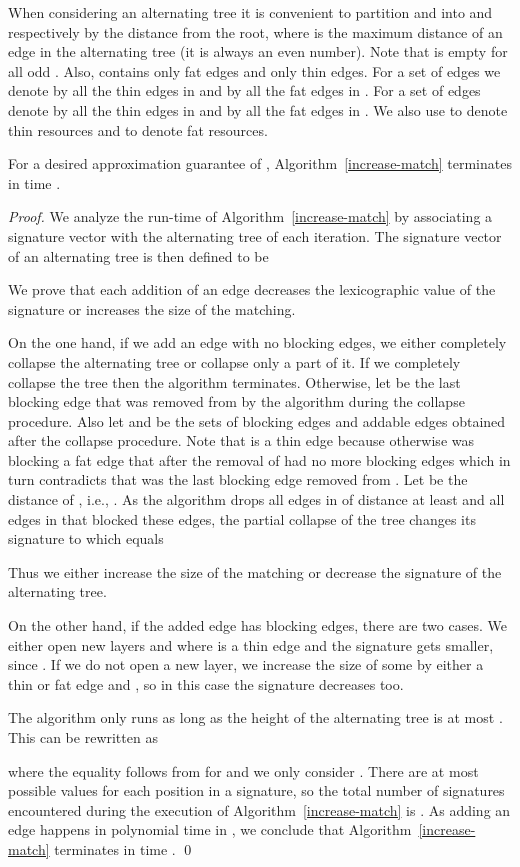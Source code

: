\documentclass{llncs}
\begin{document}
When considering an alternating tree it is convenient to partition  and 
into  and  respectively by the
distance from the root, where  is the maximum distance of an edge in the
alternating tree (it is always an even number). Note that  is empty for all
odd . Also,  contains only fat edges and  only thin edges.
For a set of edges  we denote by  all the thin edges in  and by 
all the fat edges in .  For a set of edges  denote by  all the thin
edges in  and by  all the fat edges in . We also use  to
denote thin resources and  to denote fat resources.

\begin{lemma}
\label{lemma:termination}
For a desired approximation guarantee of , Algorithm~\ref{increase-match} terminates in time
.\end{lemma}
\begin{proof}
We analyze the run-time of Algorithm~\ref{increase-match} by
associating a signature vector with the alternating tree of each
iteration. The signature vector of an alternating tree is then defined to be


We prove that each addition of an edge decreases the lexicographic value of
the signature or increases the size of the matching.

On the one hand, if we add an edge with no blocking edges, we either completely
collapse the alternating tree or collapse only a part of it.
If we completely collapse the tree then the algorithm terminates. Otherwise, let
 be the last blocking edge that was removed from  by the algorithm during
the collapse procedure. Also let  and  be the sets of  blocking edges
and addable edges obtained after the collapse procedure. Note that  is a
thin edge because otherwise  was blocking a fat edge  that after the
removal of  had no more blocking edges which in turn contradicts that 
was the last blocking edge removed from . Let  be the distance of
, i.e., . As the algorithm drops all edges in  of
distance at least  and all edges in  that  blocked these edges, the
partial collapse of the tree changes its 
signature to  which equals

Thus we either
increase the size of the matching or decrease the signature of the alternating
tree.

On the other hand, if the added edge  has blocking edges, there are two
cases. We either open new layers  and  where  is a
thin edge and the signature gets smaller, since . If we do
not open a new layer, we increase the size of some  by either a thin or fat edge and
, so in this case the signature decreases too.

The algorithm only runs as long as the height of the alternating tree is at most
. This can
be rewritten as

where the equality follows from  for  and we only
consider . There are at most
 possible values for each position in a signature, so the total
number of signatures encountered during the execution of
Algorithm~\ref{increase-match} is . As adding an edge happens in polynomial time in , we conclude that Algorithm~\ref{increase-match} terminates
in time . \qed
\end{proof}
\end{document}
